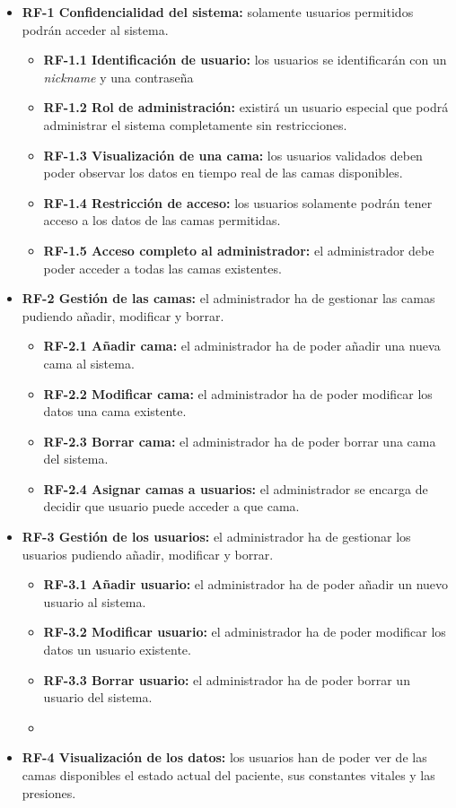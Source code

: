 \begin{itemize}
\tightlist
\item
\textbf{RF-1 Confidencialidad del sistema:} solamente usuarios permitidos podrán acceder al sistema.
	\begin{itemize}
		\tightlist
		\item
		\textbf{RF-1.1 Identificación de usuario:} los usuarios se identificarán con un \textit{nickname} y una contraseña 
		\item
		\textbf{RF-1.2 Rol de administración:} existirá un usuario especial que podrá administrar el sistema completamente sin restricciones.
		\item 
		\textbf{RF-1.3 Visualización de una cama:} los usuarios validados deben poder observar los datos en tiempo real de las camas disponibles. 
		\item
		\textbf{RF-1.4 Restricción de acceso:} los usuarios solamente podrán tener acceso a los datos de las camas permitidas. 
		\item
		\textbf{RF-1.5 Acceso completo al administrador:} el administrador debe poder acceder a todas las camas existentes. 
	\end{itemize}	
\item
\textbf{RF-2 Gestión de las camas:} el administrador ha de gestionar las camas pudiendo añadir, modificar y borrar.
	\begin{itemize}
		\tightlist
		\item
		\textbf{RF-2.1 Añadir cama:} el administrador ha de poder añadir una nueva cama al sistema.
		\item
		\textbf{RF-2.2 Modificar cama:} el administrador ha de poder modificar los datos una cama existente.
		\item
		\textbf{RF-2.3 Borrar cama:} el administrador ha de poder borrar una cama del sistema.
		\item
		\textbf{RF-2.4 Asignar camas a usuarios:} el administrador se encarga de decidir que usuario puede acceder a que cama.
	\end{itemize}
\item
\textbf{RF-3 Gestión de los usuarios:} el administrador ha de gestionar los usuarios pudiendo añadir, modificar y borrar.
	\begin{itemize}
		\tightlist
		\item
		\textbf{RF-3.1 Añadir usuario:} el administrador ha de poder añadir un nuevo usuario al sistema.
		\item
		\textbf{RF-3.2 Modificar usuario:} el administrador ha de poder modificar los datos un usuario existente.
		\item
		\textbf{RF-3.3 Borrar usuario:} el administrador ha de poder borrar un usuario del sistema.
		\item
	\end{itemize}
\item 
\textbf{RF-4 Visualización de los datos:} los usuarios han de poder ver de las camas disponibles el estado actual del paciente, sus constantes vitales y las presiones.
\end{itemize}	
	

